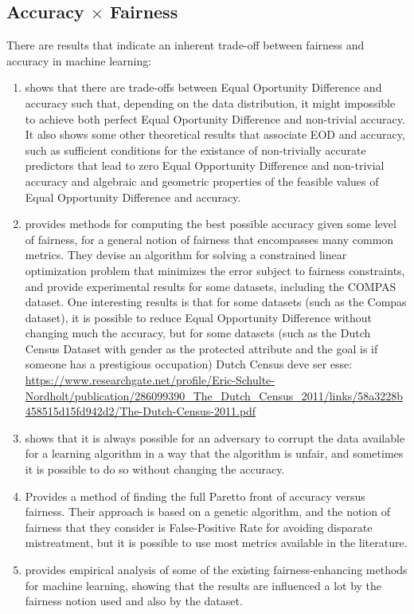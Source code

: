 \subsection{Accuracy $\times$ Fairness}

There are results that indicate an inherent trade-off between fairness and accuracy in machine learning:

\begin{enumerate}
\item \cite{Carlos} shows that there are trade-offs between Equal Oportunity Difference and accuracy such that, depending on the data distribution, it might impossible to achieve both perfect Equal Oportunity Difference and non-trivial accuracy. It also shows some other theoretical results that associate EOD and accuracy, such as sufficient conditions for the existance of non-trivially accurate predictors that lead to zero Equal Opportunity Difference and non-trivial accuracy and algebraic and geometric properties of the feasible values of Equal Opportunity Difference and accuracy.
\item \cite{Reductions} provides methods for computing the best possible accuracy given some level of fairness, for a general notion of fairness that encompasses many common metrics. They devise an algorithm for solving a constrained linear optimization problem that minimizes the error subject to fairness constraints, and provide experimental results for some datasets, including the COMPAS \cite{Compass} dataset. One interesting results is that for some datasets (such as the Compas dataset), it is possible to reduce Equal Opportunity Difference without changing much the accuracy, but for some datasets (such as the Dutch Census Dataset\cite{Dutch} with gender as the protected attribute and the goal is if someone has a prestigious occupation) {\color{red} Dutch Census deve ser esse: \url{https://www.researchgate.net/profile/Eric-Schulte-Nordholt/publication/286099390_The_Dutch_Census_2011/links/58a3228b458515d15fd942d2/The-Dutch-Census-2011.pdf}}
\item \cite{On the Impossibility of Fairness-Aware Learning from Corrupted Data} shows that it is always possible for an adversary to corrupt the data available for a learning algorithm in a way that the algorithm is unfair, and sometimes it is possible to do so without changing the accuracy.
\item \cite{How fair can we go in machine learning? Assessing the boundaries of accuracy and fairness} Provides a method of finding the full Paretto front of accuracy versus fairness. Their approach is based on a genetic algorithm, and the notion of fairness that they consider is False-Positive Rate for avoiding disparate mistreatment, but it is possible to use most metrics available in the literature.
\item \cite{A comparative study of fairness-enhancing interventions in machine learning} provides empirical analysis of some of the existing fairness-enhancing methods for machine learning, showing that the results are influenced a lot by the fairness notion used and also by the dataset.
\end{enumerate}

